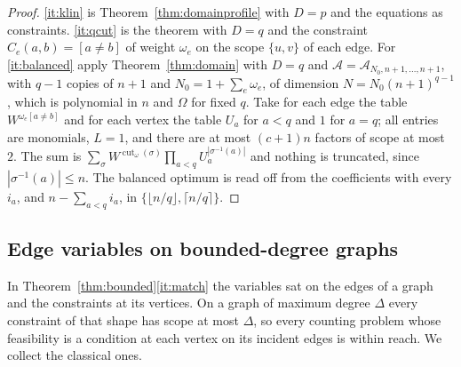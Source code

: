 \documentclass[11pt,reqno]{amsart}
\numberwithin{equation}{section}
\theoremstyle{plain}
\theoremstyle{definition}
\theoremstyle{remark}
\DeclareMathOperator{\cut}{cut}
\newcommand{\A}{\mathcal{A}}
\begin{document}
\begin{proof}
\ref{it:klin} is Theorem~\ref{thm:domainprofile} with $D=p$ and the equations as
constraints. \ref{it:qcut} is the theorem with $D=q$ and the constraint
$C_e(a,b)=[a\ne b]$ of weight $\omega_e$ on the scope $\{u,v\}$ of each edge.
For \ref{it:balanced} apply Theorem~\ref{thm:domain} with $D=q$ and
$\A=\A_{N_0,n+1,\dots,n+1}$, with $q-1$ copies of $n+1$ and
$N_0=1+\sum_e\omega_e$, of dimension $N=N_0(n+1)^{q-1}$, which is polynomial in
$n$ and $\Omega$ for fixed $q$. Take for each edge the table
$W^{\omega_e[a\ne b]}$ and for each vertex the table $U_a$ for $a<q$ and $1$ for
$a=q$; all entries are monomials, $L=1$, and there are at most $(c+1)n$ factors
of scope at most $2$. The sum is
$\sum_\sigma W^{\cut_\omega(\sigma)}\prod_{a<q}U_a^{|\sigma^{-1}(a)|}$ and nothing
is truncated, since $|\sigma^{-1}(a)|\le n$. The balanced optimum is read off
from the coefficients with every $i_a$, and $n-\sum_{a<q}i_a$, in
$\{\lfloor n/q\rfloor,\lceil n/q\rceil\}$.
\end{proof}

\subsection{Edge variables on bounded-degree graphs}\label{ssec:edges}
In Theorem~\ref{thm:bounded}\ref{it:match} the variables sat on the edges of a
graph and the constraints at its vertices. On a graph of maximum degree
$\Delta$ every constraint of that shape has scope at most $\Delta$, so every
counting problem whose feasibility is a condition at each vertex on its
incident edges is within reach. We collect the classical ones.
\end{document}

